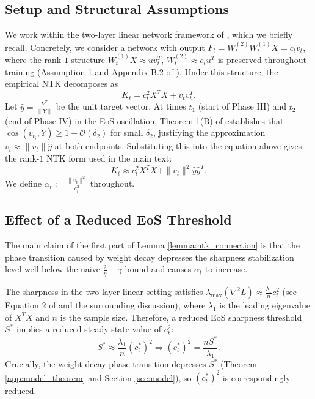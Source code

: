 \documentclass{article}
\begin{document}
\subsection{Setup and Structural Assumptions}

We work within the two-layer linear network framework of \citep{ntk_eos}, which we briefly recall. Concretely, we consider a network with output $F_t = W_t^{(2)} W_t^{(1)} X = c_t v_t$, where the rank-$1$ structure $W_t^{(1)} X \approx u v_t^T$, $W_t^{(2)} \approx c_t u^T$ is preserved throughout training (Assumption 1 and Appendix B.2 of \citep{ntk_eos}). Under this structure, the empirical NTK decomposes as
\[
    K_t = c_t^2 X^TX + v_t v_t^T.
\]
Let $\hat{y} = \frac{Y^T} {\|Y\|}$ be the unit target vector. At times $t_1$ (start of Phase III) and $t_2$ (end of Phase IV) in the EoS oscillation, Theorem 1(B) of \citep{ntk_eos} establishes that $\cos(v_{t_i}, Y) \geq 1 - \mathcal{O}(\delta_2)$ for small $\delta_2$, justifying the approximation $v_t \approx \|v_t\|\hat{y}$ at both endpoints. Substituting this into the equation above gives the rank-$1$ NTK form used in the main text:
\begin{equation}
    K_t \approx c_t^2 X^T X + \|v_t\|^2\hat{y}\hat{y}^T.
    \label{eq:ntk-rank1}
\end{equation}
We define $\alpha_t := \frac{\|v_t\|^2}{c_t^2}$ throughout.

\subsection{Effect of a Reduced EoS Threshold}

The main claim of the first part of Lemma \ref{lemma:ntk_connection} is that the phase transition caused by weight decay depresses the sharpness stabilization level well below the naive $\frac{2}{\eta} - \gamma$ bound and causes $\alpha_t$ to increase.

The sharpness in the two-layer linear setting satisfies $\lambda_{\max}(\nabla^2 L) \approx \frac{\lambda_1}{n} c_t^2$ (see Equation 2 of \citep{ntk_eos} and the surrounding discussion), where $\lambda_1$ is the leading eigenvalue of $X^T X$ and $n$ is the sample size. Therefore, a reduced EoS sharpness threshold $S^*$ implies a reduced steady-state value of $c_t^2$:
\[
    S^* \approx \frac{\lambda_1} {n}\left(c^*_t\right)^{2}
    \Longrightarrow
    \left(c^*_t\right)^{2} = \frac{n S^*}{\lambda_1}.
\]
Crucially, the weight decay phase transition depresses $S^*$ (Theorem \ref{app:model_theorem} and Section \ref{sec:model}), so $\left(c^*_t\right)^{2}$ is correspondingly reduced.
\end{document}
